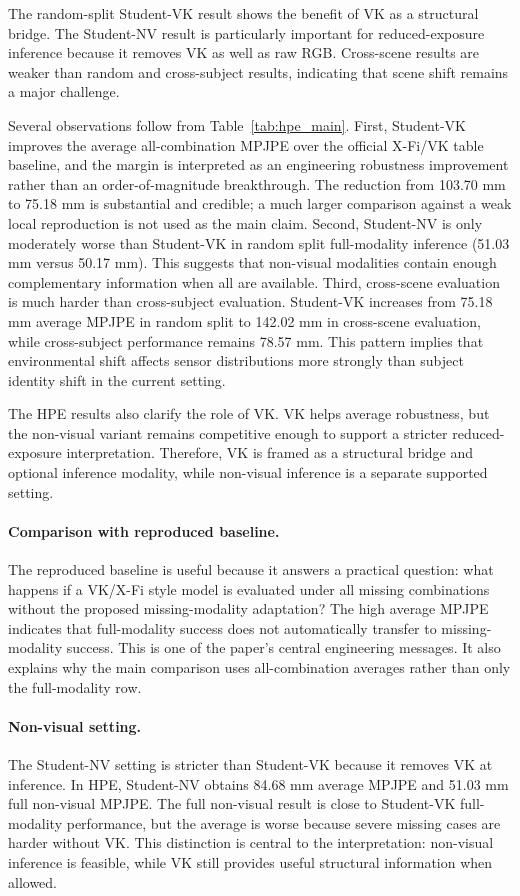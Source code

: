 \documentclass[preprint,12pt]{elsarticle}
\newcommand{\mpjpe}{MPJPE}
\begin{document}
The random-split Student-VK result shows the benefit of VK as a structural bridge. The Student-NV result is particularly important for reduced-exposure inference because it removes VK as well as raw RGB. Cross-scene results are weaker than random and cross-subject results, indicating that scene shift remains a major challenge.

Several observations follow from Table~\ref{tab:hpe_main}. First, Student-VK improves the average all-combination \mpjpe{} over the official X-Fi/VK table baseline, and the margin is interpreted as an engineering robustness improvement rather than an order-of-magnitude breakthrough. The reduction from 103.70 mm to 75.18 mm is substantial and credible; a much larger comparison against a weak local reproduction is not used as the main claim. Second, Student-NV is only moderately worse than Student-VK in random split full-modality inference (51.03 mm versus 50.17 mm). This suggests that non-visual modalities contain enough complementary information when all are available. Third, cross-scene evaluation is much harder than cross-subject evaluation. Student-VK increases from 75.18 mm average \mpjpe{} in random split to 142.02 mm in cross-scene evaluation, while cross-subject performance remains 78.57 mm. This pattern implies that environmental shift affects sensor distributions more strongly than subject identity shift in the current setting.

The HPE results also clarify the role of VK. VK helps average robustness, but the non-visual variant remains competitive enough to support a stricter reduced-exposure interpretation. Therefore, VK is framed as a structural bridge and optional inference modality, while non-visual inference is a separate supported setting.

\paragraph{Comparison with reproduced baseline.}
The reproduced baseline is useful because it answers a practical question: what happens if a VK/X-Fi style model is evaluated under all missing combinations without the proposed missing-modality adaptation? The high average \mpjpe{} indicates that full-modality success does not automatically transfer to missing-modality success. This is one of the paper's central engineering messages. It also explains why the main comparison uses all-combination averages rather than only the full-modality row.

\paragraph{Non-visual setting.}
The Student-NV setting is stricter than Student-VK because it removes VK at inference. In HPE, Student-NV obtains 84.68 mm average \mpjpe{} and 51.03 mm full non-visual \mpjpe{}. The full non-visual result is close to Student-VK full-modality performance, but the average is worse because severe missing cases are harder without VK. This distinction is central to the interpretation: non-visual inference is feasible, while VK still provides useful structural information when allowed.
\end{document}
